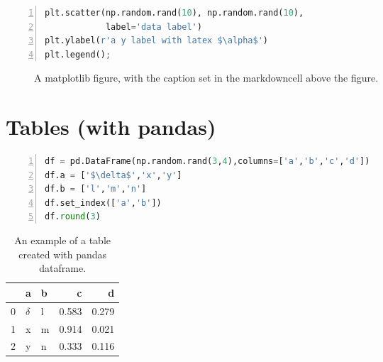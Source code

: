 \documentclass[10pt,parskip=half,
	toc=sectionentrywithdots,
	bibliography=totocnumbered,
	captions=tableheading,numbers=noendperiod]{scrartcl}
\begin{document}
\begin{codecell}

    \caption{The plotting code for a matplotlib figure (\cref{fig:example_mpl}).}\label{code:example_mpl}\begin{lstlisting}[language=Python,numbers=left,xleftmargin=20pt,xrightmargin=5pt,belowskip=5pt,aboveskip=5pt]
plt.scatter(np.random.rand(10), np.random.rand(10), 
            label='data label')
plt.ylabel(r'a y label with latex $\alpha$')
plt.legend();
\end{lstlisting}\end{codecell}

\begin{figure}
        \begin{center}\end{center}\caption{A matplotlib figure, with the caption set in the markdowncell above the figure.}\label{fig:example_mpl}
    \end{figure}

\section{Tables (with pandas)}\label{tables-with-pandas}

\begin{codecell}[H]

    \caption{The plotting code for a pandas Dataframe table (\cref{tbl:example}).}\label{code:example_pd}\begin{lstlisting}[language=Python,numbers=left,xleftmargin=20pt,xrightmargin=5pt,belowskip=5pt,aboveskip=5pt]
df = pd.DataFrame(np.random.rand(3,4),columns=['a','b','c','d'])
df.a = ['$\delta$','x','y']
df.b = ['l','m','n']
df.set_index(['a','b'])
df.round(3)
\end{lstlisting}\end{codecell}

    \begin{table}[H]\caption{An example of a table created with pandas dataframe.}\label{tbl:example}

        \centering{}
        \begin{tabular}{lllrr}
\toprule
{} &         a &  b &      c &      d \\
\midrule
0 &  $\delta$ &  l &  0.583 &  0.279 \\
1 &         x &  m &  0.914 &  0.021 \\
2 &         y &  n &  0.333 &  0.116 \\
\bottomrule
\end{tabular}

        \end{table}
\end{document}
